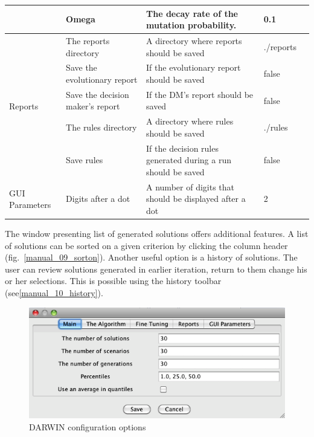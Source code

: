 \begin{table}[htb]
\begin{tabular}{l p{3.5cm} p{6.5cm} l l}
    & Omega & The decay rate of the mutation probability. & 0.1  \\
    \hline
    \multirow{5}{*}{Reports} 
    & The reports directory & A directory where reports should be saved &
    ./reports  \\
    & Save the evolutionary report & If the evolutionary report should be
    saved & false \\
    & Save the decision maker's report & If the DM's report should be
    saved & false \\
    & The rules directory & A directory where rules should be saved &
    ./rules  \\
    & Save rules & If the decision rules generated during a run should be
    saved & false \\
    \hline
    \multirow{1}{*}{GUI Parameters}
    & Digits after a dot & A number of digits that should be displayed after a
    dot & 2 \\    
    \hline
  \end{tabular}
\end{table}


The window presenting list of generated solutions offers additional
features. A list of solutions can be sorted on a given criterion by clicking
the column header (fig.~\ref{manual_09_sorton}). Another useful option is a
history of solutions. The user can review solutions generated in earlier
iteration, return to them change his or her selections. This is possible using
the history toolbar (see\ref{manual_10_history}).

\begin{figure}
  \centering
  \includegraphics[scale=0.7]{img/manual/08_options}
  \caption{DARWIN configuration options}
  \label{manual_08_options}
\end{figure}

